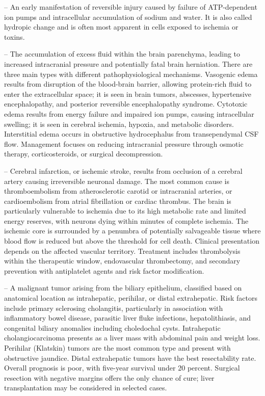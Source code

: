 -- An early manifestation of reversible injury caused by failure of ATP-dependent ion pumps and intracellular accumulation of sodium and water. It is also called hydropic change and is often most apparent in cells exposed to ischemia or toxins.

-- The accumulation of excess fluid within the brain parenchyma, leading to increased intracranial pressure and potentially fatal brain herniation. There are three main types with different pathophysiological mechanisms. Vasogenic edema results from disruption of the blood-brain barrier, allowing protein-rich fluid to enter the extracellular space; it is seen in brain tumors, abscesses, hypertensive encephalopathy, and posterior reversible encephalopathy syndrome. Cytotoxic edema results from energy failure and impaired ion pumps, causing intracellular swelling; it is seen in cerebral ischemia, hypoxia, and metabolic disorders. Interstitial edema occurs in obstructive hydrocephalus from transependymal CSF flow. Management focuses on reducing intracranial pressure through osmotic therapy, corticosteroids, or surgical decompression.

-- Cerebral infarction, or ischemic stroke, results from occlusion of a cerebral artery causing irreversible neuronal damage. The most common cause is thromboembolism from atherosclerotic carotid or intracranial arteries, or cardioembolism from atrial fibrillation or cardiac thrombus. The brain is particularly vulnerable to ischemia due to its high metabolic rate and limited energy reserves, with neurons dying within minutes of complete ischemia. The ischemic core is surrounded by a penumbra of potentially salvageable tissue where blood flow is reduced but above the threshold for cell death. Clinical presentation depends on the affected vascular territory. Treatment includes thrombolysis within the therapeutic window, endovascular thrombectomy, and secondary prevention with antiplatelet agents and risk factor modification.

-- A malignant tumor arising from the biliary epithelium, classified based on anatomical location as intrahepatic, perihilar, or distal extrahepatic. Risk factors include primary sclerosing cholangitis, particularly in association with inflammatory bowel disease, parasitic liver fluke infections, hepatolithiasis, and congenital biliary anomalies including choledochal cysts. Intrahepatic cholangiocarcinoma presents as a liver mass with abdominal pain and weight loss. Perihilar (Klatskin) tumors are the most common type and present with obstructive jaundice. Distal extrahepatic tumors have the best resectability rate. Overall prognosis is poor, with five-year survival under 20 percent. Surgical resection with negative margins offers the only chance of cure; liver transplantation may be considered in selected cases.

